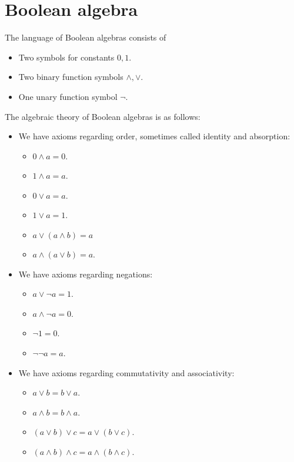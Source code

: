 \documentclass{../util/zariski-small}
\begin{document}
\section{Boolean algebra}
\begin{definition}
  The language of Boolean algebras consists of
  \begin{itemize}
    \item Two symbols for constants $0,1$. 
    \item Two binary function symbols $\wedge, \vee$.
    \item One unary function symbol $\neg$. 
  \end{itemize}
\end{definition}
\begin{definition}
  The algebraic theory of Boolean algebras is as follows:
  \begin{itemize}
    \item We have axioms regarding order, sometimes called identity and absorption:
    \begin{itemize}
      \item $0 \wedge a = 0$. 
      \item $1 \wedge a = a$. 
      \item $0 \vee a = a$. 
      \item $1 \vee a = 1$. 
      \item $a \vee (a \wedge b) = a$
      \item $a \wedge (a \vee b) = a$. 
    \end{itemize}
    \item We have axioms regarding negations:
      \begin{itemize}
        \item $a \vee \neg a = 1$. 
        \item $a \wedge \neg a = 0$. 
        \item $\neg 1 = 0$. 
        \item $\neg \neg a = a$. 
      \end{itemize}
    \item We have axioms regarding commutativity and associativity:
      \begin{itemize}
        \item $a \vee b = b \vee a$. 
        \item $a \wedge b = b \wedge a$. 
        \item $(a \vee b) \vee c = a \vee (b \vee c)$. 
        \item $(a \wedge b) \wedge c = a \wedge (b \wedge c)$. 

\end{itemize}
\end{itemize}
\end{definition}
\end{document}
